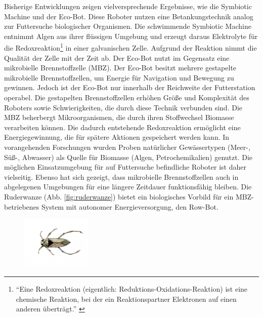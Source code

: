 \documentclass{SeminarV2}
\begin{document}
Bisherige Entwicklungen zeigen vielversprechende Ergebnisse, wie die Symbiotic Machine und der Eco-Bot. Diese Roboter nutzen eine Betankungstechnik analog zur Futtersuche biologischer Organismen. Die schwimmende Symbiotic Machine entnimmt Algen aus ihrer flüssigen Umgebung und erzeugt daraus Elektrolyte für die Redoxreaktion\footnote{"`Eine Redoxreaktion (eigentlich: Reduktions-Oxidations-Reaktion) ist eine chemische Reaktion, bei der ein Reaktionspartner Elektronen auf einen anderen überträgt."' \cite{redox}} in einer galvanischen Zelle. Aufgrund der Reaktion nimmt die Qualität der Zelle mit der Zeit ab. Der Eco-Bot nutzt im Gegensatz eine mikrobielle Brennstoffzelle (MBZ).  Der Eco-Bot besitzt mehrere gestapelte mikrobielle Brennstoffzellen, um Energie für Navigation und Bewegung zu gewinnen. Jedoch ist der Eco-Bot nur innerhalb der Reichweite der Futterstation operabel. Die gestapelten Brennstoffzellen erhöhen Größe und Komplexität des Roboters sowie Schwierigkeiten, die durch diese Technik verbunden sind.\cite[S. 3888]{DBLP:conf/iros/PhilamoreRSI15} Die MBZ beherbergt Mikroorganismen, die durch ihren Stoffwechsel Biomasse verarbeiten können. Die dadurch entstehende Redoxreaktion ermöglicht eine Energiegewinnung, die für spätere Aktionen gespeichert werden kann.\cite{MBZ} In vorangehenden Forschungen wurden Proben natürlicher Gewässertypen (Meer-, Süß-, Abwasser) als Quelle für Biomasse (Algen, Petrochemikalien) genutzt. Die möglichen Einsatzumgebung für auf Futtersuche befindliche Roboter ist daher vielseitig. Ebenso hat sich gezeigt, dass mikrobielle Brennstoffzellen auch in abgelegenen Umgebungen für eine längere Zeitdauer funktionsfähig bleiben. Die Ruderwanze (Abb. \ref{fig:ruderwanze}) bietet ein biologisches Vorbild für ein MBZ-betriebenes System mit autonomer Energieversorgung, den Row-Bot.\cite[S. 3888]{DBLP:conf/iros/PhilamoreRSI15}

\begin{figure}[ht]
\centering
\includegraphics[width=0.3\textwidth]{pics/734-illustration-small}
\end{figure}
\end{document}
